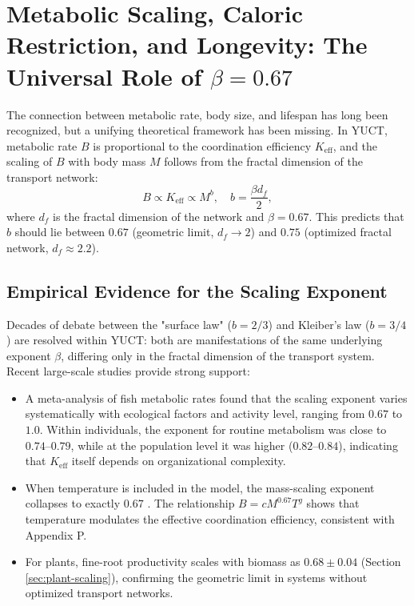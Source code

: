 \documentclass[11pt]{article}
\newcommand{\Keff}{K_{\mathrm{eff}}}
\begin{document}
	\section{Metabolic Scaling, Caloric Restriction, and Longevity: The Universal Role of \(\beta = 0.67\)}
	\label{sec:metabolism}
	
	The connection between metabolic rate, body size, and lifespan has long been recognized, but a unifying theoretical framework has been missing. In YUCT, metabolic rate \(B\) is proportional to the coordination efficiency \(\Keff\), and the scaling of \(B\) with body mass \(M\) follows from the fractal dimension of the transport network:
	\begin{equation}
		B \propto \Keff \propto M^{b}, \quad b = \frac{\beta d_f}{2},
	\end{equation}
	where \(d_f\) is the fractal dimension of the network and \(\beta = 0.67\). This predicts that \(b\) should lie between \(0.67\) (geometric limit, \(d_f \to 2\)) and \(0.75\) (optimized fractal network, \(d_f \approx 2.2\)). 
	
	\subsection{Empirical Evidence for the Scaling Exponent}
	
	Decades of debate between the "surface law" (\(b = 2/3\)) and Kleiber's law (\(b = 3/4\)) are resolved within YUCT: both are manifestations of the same underlying exponent \(\beta\), differing only in the fractal dimension of the transport system. Recent large-scale studies provide strong support:
	
	\begin{itemize}
		\item A meta-analysis of fish metabolic rates \cite{Killen2016} found that the scaling exponent varies systematically with ecological factors and activity level, ranging from \(0.67\) to \(1.0\). Within individuals, the exponent for routine metabolism was close to \(0.74\)–\(0.79\), while at the population level it was higher (\(0.82\)–\(0.84\)), indicating that \(\Keff\) itself depends on organizational complexity.
		\item When temperature is included in the model, the mass-scaling exponent collapses to exactly \(0.67\) \cite{SICB2022}. The relationship \(B = c M^{0.67} T^{g}\) shows that temperature modulates the effective coordination efficiency, consistent with Appendix P.
		\item For plants, fine-root productivity scales with biomass as \(0.68 \pm 0.04\) (Section \ref{sec:plant-scaling}), confirming the geometric limit in systems without optimized transport networks.
	\end{itemize}
	
\end{document}
